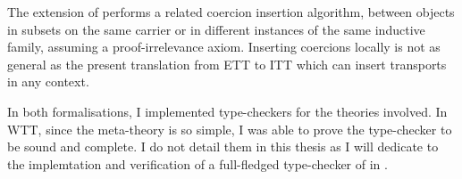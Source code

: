 The   extension of \Coq performs a
related coercion insertion algorithm, between objects in subsets on the
same carrier or in different instances of the same inductive family,
assuming a proof-irrelevance axiom. Inserting coercions locally is not
as general as the present translation from \acrshort{ETT} to \acrshort{ITT}
which can insert transports in any context.


In both formalisations, I implemented type-checkers for the theories involved.
In \acrshort{WTT}, since the meta-theory is so simple, I was able to prove the
type-checker to be sound and complete. I do not detail them in this thesis as
I will dedicate  to the implemtation and verification of
a full-fledged type-checker of \Coq in \Coq.